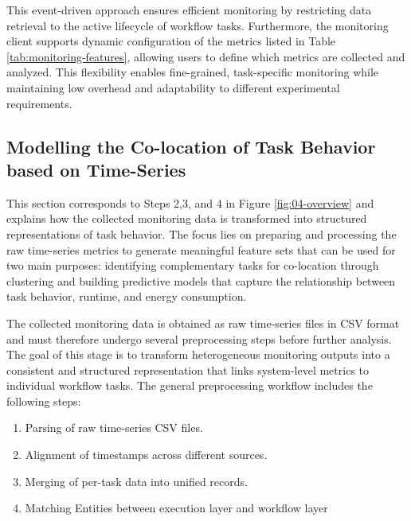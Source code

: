 This event-driven approach ensures efficient monitoring by restricting data retrieval to the active lifecycle of workflow tasks. Furthermore, the monitoring client supports dynamic configuration of the metrics listed in Table \ref{tab:monitoring-features}, allowing users to define which metrics are collected and analyzed. This flexibility enables fine-grained, task-specific monitoring while maintaining low overhead and adaptability to different experimental requirements.

\subsection{Modelling the Co-location of Task Behavior based on Time-Series}
\label{sec:data_analysis}

This section corresponds to Steps 2,3, and 4 in Figure \ref{fig:04-overview} and explains how the collected monitoring data is transformed into structured representations of task behavior. The focus lies on preparing and processing the raw time-series metrics to generate meaningful feature sets that can be used for two main purposes: identifying complementary tasks for co-location through clustering and building predictive models that capture the relationship between task behavior, runtime, and energy consumption.

\label{sec:data_preprocessing_general}

The collected monitoring data is obtained as raw time-series files in CSV format and must therefore undergo several preprocessing steps before further analysis. The goal of this stage is to transform heterogeneous monitoring outputs into a consistent and structured representation that links system-level metrics to individual workflow tasks. The general preprocessing workflow includes the following steps:

\begin{enumerate}
    \item Parsing of raw time-series CSV files.
    \item Alignment of timestamps across different sources.
    \item Merging of per-task data into unified records.
    \item Matching Entities between execution layer and workflow layer
\end{enumerate}

